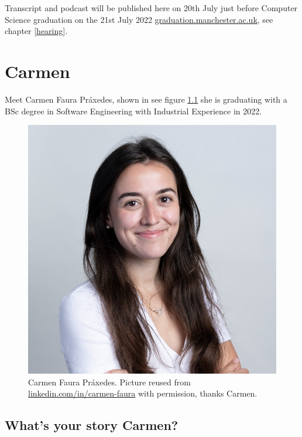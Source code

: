 \documentclass[
]{book}
\begin{document}
Transcript and podcast will be published here on 20th July just before Computer Science graduation on the 21st July 2022 \href{http://www.graduation.manchester.ac.uk/}{graduation.manchester.ac.uk}, see chapter \ref{hearing}.

\hypertarget{carmen}{%
\chapter{Carmen}\label{carmen}}

Meet Carmen Faura Práxedes, shown in see figure \ref{fig:carmen-fig} she is graduating with a BSc degree in Software Engineering with Industrial Experience in 2022.

\begin{figure}

{\centering \includegraphics[width=1\linewidth]{images/carmen} 

}

\caption{Carmen Faura Práxedes. Picture reused from \href{https://www.linkedin.com/in/carmen-faura/}{linkedin.com/in/carmen-faura} with permission, thanks Carmen. 🙏}\label{fig:carmen-fig}
\end{figure}



\hypertarget{carmen-story}{%
\section{What's your story Carmen?}\label{carmen-story}}
\end{document}
